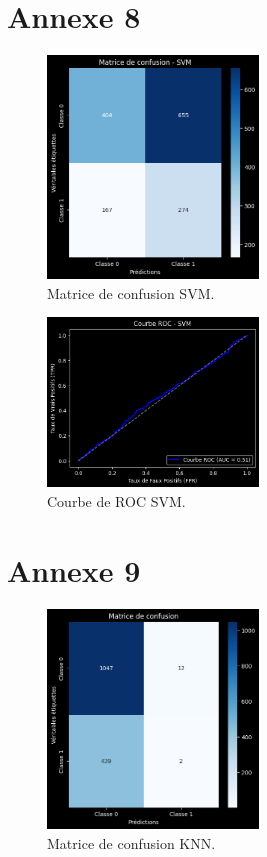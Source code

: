 \section*{Annexe 8}
\label{sec:annexe8}
\begin{figure}[H]
\centering
\includegraphics[width=0.5\textwidth]{figures/MatriceSVM.png}
\caption{Matrice de confusion SVM.}
\label{fig:annexe8}
\end{figure}


\begin{figure}[H]
\centering
\includegraphics[width=0.5\textwidth]{figures/ROCSVM.png}
\caption{Courbe de ROC SVM.}
\end{figure}

\section*{Annexe 9}
\label{sec:annexe9}
\begin{figure}[H]
\centering
\includegraphics[width=0.5\textwidth]{figures/MatriceKNN.png}
\caption{Matrice de confusion KNN.}
\label{fig:annexe9}
\end{figure}


